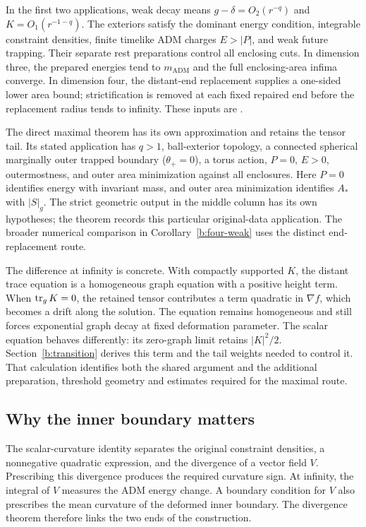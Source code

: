 In the first two applications, weak decay means
$g-\delta=O_2(r^{-q})$ and $K=O_1(r^{-1-q})$.
The exteriors satisfy the dominant energy condition, integrable
constraint densities, finite timelike ADM charges $E>|P|$, and weak
future trapping. Their separate rest preparations control all enclosing
cuts. In dimension three, the prepared energies tend to
$m_{\mathrm{ADM}}$ and the full enclosing-area infima converge. In
dimension four, the distant-end replacement supplies a one-sided lower
area bound; strictification is removed at each fixed repaired end before
the replacement radius tends to infinity. These inputs are
\cite[Proposition~7.13 and Proposition~8.8/Lemma~8.9, respectively]{NumericalCompanion}.

The direct maximal theorem has its own approximation and retains the
tensor tail. Its stated application has $q>1$, ball-exterior topology,
a connected spherical marginally outer trapped boundary ($\theta_+=0$),
a torus action, $P=0$, $E>0$,
outermostness, and outer area minimization against all enclosures.
Here $P=0$ identifies energy with invariant mass, and outer area
minimization identifies $A_*$ with $|S|_g$. The strict geometric output
in the middle column has its own hypotheses; the theorem records this
particular original-data application. The broader numerical comparison
in Corollary~\ref{b:four-weak} uses the distinct end-replacement route.

The difference at infinity is concrete.  With compactly supported $K$,
the distant trace equation is a homogeneous graph equation with a
positive height term.  When $\operatorname{tr}_gK=0$, the retained tensor contributes a
term quadratic in $\nabla f$, which becomes a drift along the solution.
The equation remains homogeneous and still forces exponential graph
decay at fixed deformation parameter.  The scalar equation behaves
differently: its zero-graph limit retains $|K|^2/2$.
Section~\ref{b:transition} derives this term and the tail weights needed
to control it.  That calculation identifies both the shared argument
and the additional preparation, threshold geometry and estimates required
for the maximal route.

\subsection{Why the inner boundary matters}

The scalar-curvature identity separates the original constraint densities,
a nonnegative quadratic expression, and the divergence of a vector field
$V$.  Prescribing this divergence produces the required curvature sign.
At infinity, the integral of $V$ measures the ADM energy change.  A
boundary condition for $V$ also prescribes the mean curvature of the
deformed inner boundary.  The divergence theorem therefore links the
two ends of the construction.

